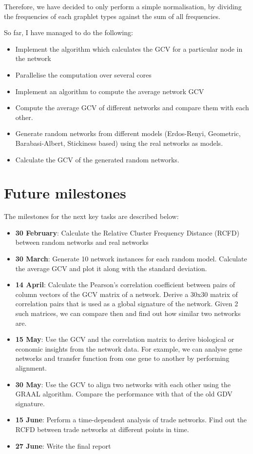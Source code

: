 Therefore, we have decided to only perform a simple normalisation, by dividing
the frequencies of each graphlet types against the sum of all frequencies.

So far, I have managed to do the following:
\begin{itemize}
 \item Implement the algorithm which calculates the GCV for a particular node in
the network
 \item Parallelise the computation over several cores
 \item Implement an algorithm to compute the average network GCV
 \item Compute the average GCV of different networks and compare them with each
other. 
 \item Generate random networks from different models (Erdos-Renyi, Geometric,
Barabasi-Albert, Stickiness based) using the real networks as models.
 \item Calculate the GCV of the generated random networks.

\end{itemize}

\section{Future milestones}

The milestones for the next key tasks are described below:
\begin{itemize}
 \item \textbf{30 February}: Calculate the Relative Cluster Frequency Distance
(RCFD) between random networks and real networks
 \item \textbf{30 March}: Generate 10 network instances for each random model.
Calculate the average GCV and plot it along with the standard deviation.
 \item \textbf{14 April}: Calculate the Pearson's correlation coefficient
between pairs of column vectors of the GCV matrix of a network. Derive a 30x30
matrix of correlation pairs that is used as a global signature of the network.
Given 2 such matrices, we can compare then and find out how similar two
networks are.
 \item \textbf{15 May}: Use the GCV and the correlation matrix to derive
biological or economic insights from the network data. For example, we can
analyse gene networks and transfer function from one gene to another by
performing alignment.
 \item \textbf{30 May}: Use the GCV to align two networks with each other
using
the GRAAL algorithm\cite{memivsevic2012c}. Compare the performance with that of
the old GDV signature.
 \item \textbf{15 June}: Perform a time-dependent analysis of trade networks.
Find out the RCFD between trade networks at different points in time.
 \item \textbf{27 June}: Write the final report


\end{itemize}



